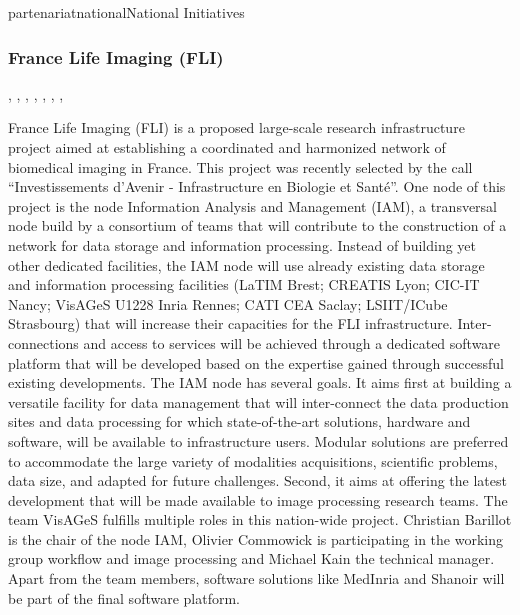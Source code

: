 \documentclass{ra2018}
\begin{document}
\begin{module}{partenariat}{national}{National Initiatives}
        
        \subsubsection{France Life Imaging (FLI)}
        \begin{participants}    	
          , 	
          ,
          ,
          ,
          ,
          ,
          ,
        \end{participants}  
        
        France Life Imaging (FLI) is a proposed large-scale research infrastructure
        project aimed at establishing a coordinated and harmonized network of
        biomedical imaging in France. This project was recently selected by the call
        ``Investissements d’Avenir - Infrastructure en Biologie et Santé''. One node of
        this project is the node Information Analysis and Management (IAM), a
        transversal node build by a consortium of teams that will contribute to the
        construction of a network for data storage and information processing. Instead
        of building yet other dedicated facilities, the IAM node will use already
        existing data storage and information processing facilities (LaTIM Brest;
        CREATIS Lyon; CIC-IT Nancy; VisAGeS U1228 Inria Rennes; CATI CEA Saclay;
        LSIIT/ICube Strasbourg) that will increase their capacities for the FLI
        infrastructure. Inter-connections and access to services will be achieved
        through a dedicated software platform that will be developed based on the
        expertise gained through successful existing developments.  The IAM node has
        several goals. It aims first at building a versatile facility for data
        management that will inter-connect the data production sites and data
        processing for which state-of-the-art solutions, hardware and software, will be
        available to infrastructure users. Modular solutions are preferred to
        accommodate the large variety of modalities acquisitions, scientific problems,
        data size, and adapted for future challenges. Second, it aims at offering the
        latest development that will be made available to image processing research
        teams.  The team VisAGeS fulfills multiple roles in this nation-wide project.
        Christian Barillot is the chair of the node IAM, Olivier Commowick is
        participating in the working group workflow and image processing and Michael
        Kain the technical manager. Apart from the team members, software solutions
        like MedInria and Shanoir will be part of the final software platform.
        

\end{module}
\end{document}
